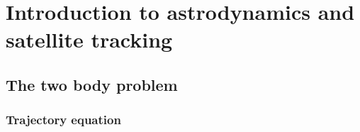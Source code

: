 \documentclass[../main.tex]{subfiles}
\begin{document}
\section{Introduction to astrodynamics and satellite tracking}
\subsection{The two body problem}\label{sec:twoBody}
\subsubsection{Trajectory equation}
\end{document}

